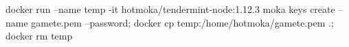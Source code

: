 \begin{shellcommandbox}\begin{ttlst}
docker run --name temp -it hotmoka/tendermint-node:1.12.3 moka keys create --name gamete.pem --password; docker cp temp:/home/hotmoka/gamete.pem .; docker rm temp
\end{ttlst}\end{shellcommandbox}
